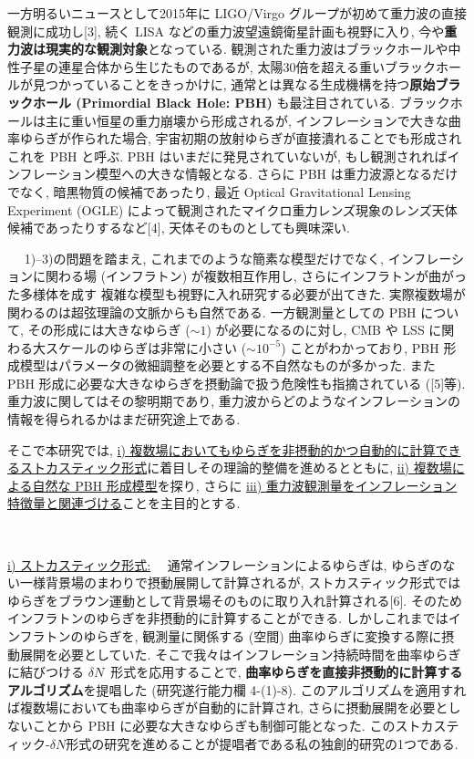 \documentclass[11pt,a4paper,uplatex,twoside,dvipdfmx]{ujarticle} 	%
\renewcommand{\emph}[1]{{\sffamily\gtfamily\bfseries #1}}
\newcommand{\subject}[1]{\noindent{\sffamily\gtfamily\bfseries #1}~~}
\newcommand{\subsubject}[1]{\noindent \ul{#1}~~}
\newcommand{\研究課題名}{\mgfamily ストカスティック形式、原始ブラックホール、重力波観測から迫るインフレーション}
\newcommand{\研究機関名}{\mgfamily 名古屋大学}
\newcommand{\申請者氏名}{\mgfamily 多田 祐一郎}
\newcommand{\研究代表者氏名}{\申請者氏名}
\newcommand{\研究期間の最終元号年度}{34}	%
\begin{document}
{	一方明るいニュースとして2015年に LIGO/Virgo グループが初めて重力波の直接観測に成功し[3],
	続く LISA などの重力波望遠鏡衛星計画も視野に入り, 今や\emph{重力波は現実的な観測対象}となっている.
	観測された重力波はブラックホールや中性子星の連星合体から生じたものであるが,
	太陽30倍を超える重いブラックホールが見つかっていることをきっかけに, 通常とは異なる生成機構を持つ\emph{原始ブラックホール (Primordial Black Hole: PBH)} も最注目されている.
	ブラックホールは主に重い恒星の重力崩壊から形成されるが, インフレーションで大きな曲率ゆらぎが作られた場合, 宇宙初期の放射ゆらぎが直接潰れることでも形成されこれを PBH と呼ぶ.
	PBH はいまだに発見されていないが, もし観測されればインフレーション模型への大きな情報となる. 
	さらに PBH は重力波源となるだけでなく, 暗黒物質の候補であったり, 最近 Optical Gravitational Lensing Experiment (OGLE) によって観測されたマイクロ重力レンズ現象のレンズ天体候補であったりするなど[4],
	天体そのものとしても興味深い.
	
	
	
	\vspace{3pt}
	\subject{2. 問題点および解決方策}
	1)--3)の問題を踏まえ, これまでのような簡素な模型だけでなく,
	インフレーションに関わる場 (インフラトン) が複数相互作用し, さらにインフラトンが曲がった多様体を成す
	複雑な模型も視野に入れ研究する必要が出てきた. 実際複数場が関わるのは超弦理論の文脈からも自然である.
	一方観測量としての PBH について, その形成には大きなゆらぎ ($\sim1$) が必要になるのに対し, CMB や LSS に関わる大スケールのゆらぎは非常に小さい ($\sim10^{-5}$) ことがわかっており,
	PBH 形成模型はパラメータの微細調整を必要とする不自然なものが多かった.
	また PBH 形成に必要な大きなゆらぎを摂動論で扱う危険性も指摘されている ([5]等).
	重力波に関してはその黎明期であり, 重力波からどのようなインフレーションの情報を得られるかはまだ研究途上である.
	
	そこで本研究では, \ul{i) 複数場においてもゆらぎを非摂動的かつ自動的に計算できるストカスティック形式}に着目しその理論的整備を進めるとともに,
	\ul{ii) 複数場による自然な PBH 形成模型}を探り, さらに \ul{iii) 重力波観測量をインフレーション特徴量と関連づける}ことを主目的とする.
	
	
	\vspace{3pt}
	\subject{3. 研究目的・方法および独創性}
	
	\subsubject{i) ストカスティック形式:}
	通常インフレーションによるゆらぎは, ゆらぎのない一様背景場のまわりで摂動展開して計算されるが,
	ストカスティック形式ではゆらぎをブラウン運動として背景場そのものに取り入れ計算される[6]. 
	そのためインフラトンのゆらぎを非摂動的に計算することができる.
	しかしこれまではインフラトンのゆらぎを, 観測量に関係する (空間) 曲率ゆらぎに変換する際に摂動展開を必要としていた.
	そこで我々はインフレーション持続時間を曲率ゆらぎに結びつける $\delta N$~形式を応用することで,
	\emph{曲率ゆらぎを直接非摂動的に計算するアルゴリズム}を提唱した (研究遂行能力欄 4-(1)-8).
	このアルゴリズムを適用すれば複数場においても曲率ゆらぎが自動的に計算され,
	さらに摂動展開を必要としないことから PBH に必要な大きなゆらぎも制御可能となった.
	このストカスティック-$\delta N$形式の研究を進めることが提唱者である私の独創的研究の1つである.
	
}
\end{document}
